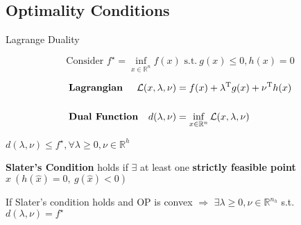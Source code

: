 
\subsection{Optimality Conditions}

\begin{sstTitleBox}{
		Lagrange Duality
	}
	\begin{centering}
		\vspace{-1.5mm}
		\begin{equation}\text{Consider }
			f^\star = \inf_{x\in\mathcal{\mathbb{R}}^n}f(x)
			\text{ s.t.}\ g(x)\le0,h(x)=0
			\label{eq:dual}
		\end{equation}


		\begin{sstFullFrame}
			{\color{white}
				\vspace{-2mm}
				\[\begin{aligned}
						 & \textbf{Lagrangian}
						 & \hspace{-4mm}	\mathcal{L}(x,\lambda,\nu)
						 & = f(x) + \lambda\T g(x)+\nu\T h(x)
						\\
						\\
						 & \textbf{Dual Function}
						 & \hspace{-4mm}		d(\lambda,\nu)            & = \inf_{x \in \mathcal{\mathbb{R}}^n}\mathcal{L}(x,\lambda,\nu)
					\end{aligned}\]
				\vspace{-2.7mm}
			}
		\end{sstFullFrame}
	\end{centering}
\end{sstTitleBox}

\begin{proposition}
	$d(\lambda,\nu)\le f^\star,\forall\lambda\ge0,\nu\in\mathbb{R}^{h}$
\end{proposition}

\begin{definition}
	\textbf{Slater's Condition} holds if $\exists$
	at least one
	\textbf{strictly feasible point}
	$\hat{x}{\ (h(\hat{x})=0,\ g(\hat{x})<0)}$
\end{definition}

\begin{proposition}
	If Slater's condition holds
	and OP is convex
	$\Rightarrow$
	$\exists \lambda \ge 0, \nu \in \mathbb{R}^{n_h}$ s.t. $d(\lambda,\nu)=f^\star$
\end{proposition}

